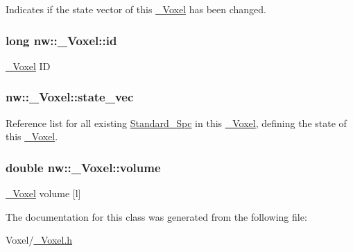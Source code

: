 Indicates if the state vector of this \hyperlink{classnw_1_1___voxel}{\+\_\+\+Voxel} has been changed. 

\hypertarget{classnw_1_1___voxel_a01b73aff9af26230df4c483c5bd81896}{
\subsubsection[{id}]{\setlength{\rightskip}{0pt plus 5cm}long nw\+::\+\_\+\+Voxel\+::id\hspace{0.3cm}{\ttfamily [protected]}}}\label{classnw_1_1___voxel_a01b73aff9af26230df4c483c5bd81896}


\hyperlink{classnw_1_1___voxel}{\+\_\+\+Voxel} I\+D 

\hypertarget{classnw_1_1___voxel_a7762f59802c2a0b54bd18acbf803ff34}{
\subsubsection[{state\+\_\+vec}]{ nw\+::\+\_\+\+Voxel\+::state\+\_\+vec\hspace{0.3cm}{\ttfamily [protected]}}}\label{classnw_1_1___voxel_a7762f59802c2a0b54bd18acbf803ff34}


Reference list for all existing \hyperlink{classnw_1_1_standard___spc}{Standard\+\_\+\+Spc} in this \hyperlink{classnw_1_1___voxel}{\+\_\+\+Voxel}, defining the state of this \hyperlink{classnw_1_1___voxel}{\+\_\+\+Voxel}. 

\hypertarget{classnw_1_1___voxel_ab55b70a476c9335f0df9d276105c0335}{
\subsubsection[{volume}]{\setlength{\rightskip}{0pt plus 5cm}double nw\+::\+\_\+\+Voxel\+::volume\hspace{0.3cm}{\ttfamily [protected]}}}\label{classnw_1_1___voxel_ab55b70a476c9335f0df9d276105c0335}


\hyperlink{classnw_1_1___voxel}{\+\_\+\+Voxel} volume \mbox{[}l\mbox{]} 



The documentation for this class was generated from the following file\+:\begin{DoxyCompactItemize}
\item 
Voxel/\hyperlink{___voxel_8h}{\+\_\+\+Voxel.\+h}\end{DoxyCompactItemize}
